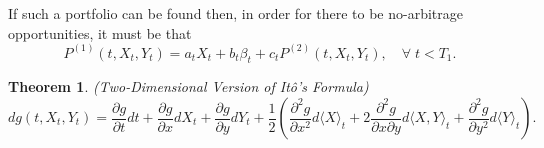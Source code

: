 \documentclass[a4paper,12pt]{article}
\numberwithin{equation}{section}
\newtheorem{theorem}{Theorem}[section]
\theoremstyle{definition}
\theoremstyle{remark}
\begin{document}
If such a portfolio can be found then, in order for there to be 
no-arbitrage opportunities, it must be that 
\begin{equation}
\label{eq:hedging_eq_sv}
    P^{(1)}(t,X_{t},Y_{t})=a_{t}X_{t}+b_{t}\beta_{t}
    +c_{t}P^{(2)}(t,X_{t},Y_{t}),\quad \forall\;t<T_{1}.
\end{equation}

\begin{theorem}
(Two-Dimensional Version of It\^o's Formula)
\begin{equation}
\label{eq:ito_formula_2dim}
    dg(t,X_{t},Y_{t})=\frac{\partial g}{\partial t}dt+\frac{\partial g}{\partial x}dX_{t}
    +\frac{\partial g}{\partial y}dY_{t}+\frac{1}{2}
    \left(\frac{\partial^{2} g}{\partial {x}^{2}}d\langle X\rangle_{t}
    +2\frac{\partial^{2} g}{\partial x\partial y}d\langle X,Y\rangle_{t}
    +\frac{\partial^{2} g}{\partial {y}^{2}}d\langle Y\rangle_{t}\right).
\end{equation}
\end{theorem}
\end{document}
